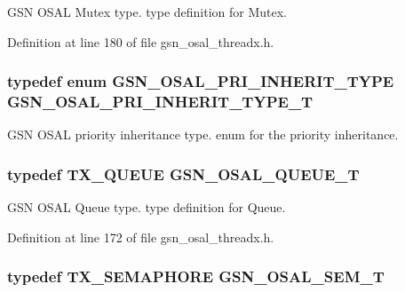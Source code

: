 GSN OSAL Mutex type. type definition for Mutex. 



Definition at line 180 of file gsn\_\-osal\_\-threadx.h.

\hypertarget{a00628_gafc2ee1bc516d2ae2d9a29757cbe45469}{
\subsubsection[{GSN\_\-OSAL\_\-PRI\_\-INHERIT\_\-TYPE\_\-T}]{\setlength{\rightskip}{0pt plus 5cm}typedef enum {\bf GSN\_\-OSAL\_\-PRI\_\-INHERIT\_\-TYPE}  {\bf GSN\_\-OSAL\_\-PRI\_\-INHERIT\_\-TYPE\_\-T}}}
\label{a00628_gafc2ee1bc516d2ae2d9a29757cbe45469}


GSN OSAL priority inheritance type. enum for the priority inheritance. 

\hypertarget{a00628_gaebe1c924d01bf6607bd65961bf134095}{
\subsubsection[{GSN\_\-OSAL\_\-QUEUE\_\-T}]{\setlength{\rightskip}{0pt plus 5cm}typedef TX\_\-QUEUE {\bf GSN\_\-OSAL\_\-QUEUE\_\-T}}}
\label{a00628_gaebe1c924d01bf6607bd65961bf134095}


GSN OSAL Queue type. type definition for Queue. 



Definition at line 172 of file gsn\_\-osal\_\-threadx.h.

\hypertarget{a00628_gab4b3554407ce22b940e2fcd3faf5fd47}{
\subsubsection[{GSN\_\-OSAL\_\-SEM\_\-T}]{\setlength{\rightskip}{0pt plus 5cm}typedef TX\_\-SEMAPHORE {\bf GSN\_\-OSAL\_\-SEM\_\-T}}}
\label{a00628_gab4b3554407ce22b940e2fcd3faf5fd47}


